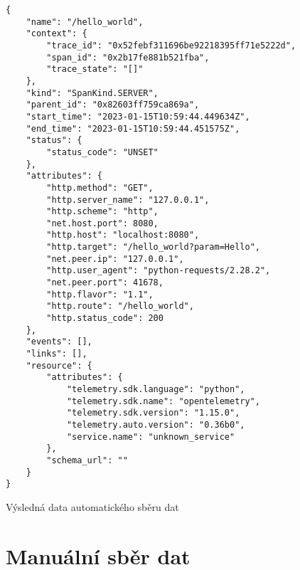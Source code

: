 \begin{listing}[H]
    \begin{verbatim}
{
    "name": "/hello_world",
    "context": {
        "trace_id": "0x52febf311696be92218395ff71e5222d",
        "span_id": "0x2b17fe881b521fba",
        "trace_state": "[]"
    },
    "kind": "SpanKind.SERVER",
    "parent_id": "0x82603ff759ca869a",
    "start_time": "2023-01-15T10:59:44.449634Z",
    "end_time": "2023-01-15T10:59:44.451575Z",
    "status": {
        "status_code": "UNSET"
    },
    "attributes": {
        "http.method": "GET",
        "http.server_name": "127.0.0.1",
        "http.scheme": "http",
        "net.host.port": 8080,
        "http.host": "localhost:8080",
        "http.target": "/hello_world?param=Hello",
        "net.peer.ip": "127.0.0.1",
        "http.user_agent": "python-requests/2.28.2",
        "net.peer.port": 41678,
        "http.flavor": "1.1",
        "http.route": "/hello_world",
        "http.status_code": 200
    },
    "events": [],
    "links": [],
    "resource": {
        "attributes": {
            "telemetry.sdk.language": "python",
            "telemetry.sdk.name": "opentelemetry",
            "telemetry.sdk.version": "1.15.0",
            "telemetry.auto.version": "0.36b0",
            "service.name": "unknown_service"
        },
        "schema_url": ""
    }
}
\end{verbatim}
    \caption{Výsledná data automatického sběru dat}
    \label{lst:exampleCodeResult}
\end{listing}



\section*{Manuální sběr dat}
\label{manual}

